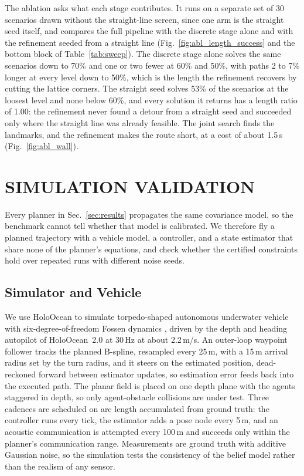 \documentclass[letterpaper, 10 pt, conference]{ieeeconf}
\theoremstyle{remark}
\begin{document}
The ablation asks what each stage contributes. It runs on a separate set of
30 scenarios drawn without the straight-line screen, since one arm is the
straight seed itself, and compares the full pipeline with the discrete stage
alone and with the refinement seeded from a straight line
(Fig.~\ref{fig:abl_length_success} and the bottom block of
Table~\ref{tab:sweep}). The discrete stage alone solves the same scenarios
down to 70\% and one or two fewer at 60\% and 50\%, with paths 2 to 7\%
longer at every level down to 50\%, which is the length the refinement
recovers by cutting the lattice corners. The straight seed solves 53\% of
the scenarios at the loosest level and none below 60\%, and every solution
it returns has a length ratio of 1.00: the refinement never found a detour
from a straight seed and succeeded only where the straight line was already
feasible. The joint search finds the landmarks, and the
refinement makes the route short, at a cost of about 1.5\,s
(Fig.~\ref{fig:abl_wall}).

\section{SIMULATION VALIDATION}
\label{sec:sim}
Every planner in Sec.~\ref{sec:results} propagates the same covariance
model, so the benchmark cannot tell whether that model is calibrated. We
therefore fly a planned trajectory with a vehicle model, a controller, and a
state estimator that share none of the planner's equations, and check
whether the certified constraints hold over repeated runs with different
noise seeds.

\subsection{Simulator and Vehicle}

We use HoloOcean \cite{potokar2024holoocean} to simulate torpedo-shaped autonomous underwater vehicle with
six-degree-of-freedom Fossen dynamics \cite{fossen2021handbook}, driven by
the depth and heading autopilot of HoloOcean~2.0 \cite{romrell2025holoocean2}
at 30\,Hz at about 2.2\,m/s. An outer-loop waypoint follower
tracks the planned B-spline, resampled every 25\,m, with a 15\,m arrival
radius set by the turn radius, and it steers on the estimated position,
dead-reckoned forward between estimator updates, so estimation error feeds
back into the executed path. The planar field is placed on one depth plane
with the agents staggered in depth, so only agent-obstacle collisions are
under test. Three cadences are scheduled on arc length accumulated from
ground truth: the controller runs every tick, the estimator adds a pose node every 5\,m, and
an acoustic communication is attempted every 100\,m and succeeds only within
the planner's communication range. Measurements are ground truth with
additive Gaussian noise, so the simulation tests the consistency of the
belief model rather than the realism of any sensor.
\end{document}

